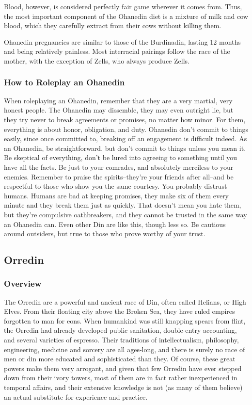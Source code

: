 \documentclass[oneside,11pt,english]{book}
\begin{document}
Blood, however, is considered perfectly fair game wherever it comes from. Thus, the most important component of the Ohanedin diet is a mixture of milk and cow blood, which they carefully extract from 
their cows without killing them. 


Ohanedin pregnancies are similar to those of the Burdinadin, lasting 12 months and being relatively 
painless. Most interracial pairings follow the race of the mother, with the exception of Zells, who always 
produce Zells. 
\subsubsection{How to Roleplay an Ohanedin}
When roleplaying an Ohanedin, remember that they are a very martial, very honest people. The Ohanedin 
may dissemble, they may even outright lie, but they try never to break agreements or promises, no matter 
how minor. For them, everything is about honor, obligation, and duty. Ohanedin don’t commit to things 
easily, since once committed to, breaking off an engagement is difficult indeed. As an Ohanedin, be 
straightforward, but don’t commit to things unless you mean it. Be skeptical of everything, don’t be lured 
into agreeing to something until you have all the facts. Be just to your comrades, and absolutely merciless 
to your enemies. Remember to praise the spirits--they’re your friends after all--and be respectful to those 
who show you the same courtesy. You probably distrust humans. Humans are bad at keeping promises, 
they make six of them every minute and they break them just as quickly. That doesn’t mean you hate 
them, but they’re compulsive oathbreakers, and they cannot be trusted in the same way an Ohanedin can. 
Even other Din are like this, though less so. Be cautious around outsiders, but true to those who prove 
worthy of your trust. 
\subsection{Orredin}
\subsubsection*{Overview} 
The Orredin are a powerful and ancient race of Din, often called Helians, or High Elves. From their 
floating city above the Broken Sea, they have ruled empires forgotten to man for eons. When humankind 
was still knapping spears from flint, the Orredin had already developed public sanitation, double-entry 
accounting, and several varieties of espresso. Their traditions of intellectualism, philosophy, engineering, 
medicine and sorcery are all ages-long, and there is surely no race of men or din more educated and sophisticated than they. 
Of course, these great powers make them very arrogant, and given that few Orredin have ever stepped 
down from their ivory towers, most of them are in fact rather inexperienced in temporal affairs, and their 
extensive knowledge is not (as many of them believe) an actual substitute for experience and practice. 
\end{document}
